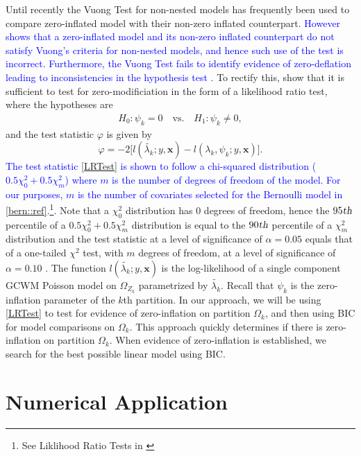 \documentclass[11pt,letterpaper]{article}
\numberwithin{equation}{section}
\numberwithin{equation}{section}
\numberwithin{equation}{section}
\begin{document}
Until recently the Vuong Test for non-nested models  \citep{vuongTest} has frequently been used to compare zero-inflated model with their non-zero inflated counterpart. \textcolor{blue}{However \cite{misuse} shows that a zero-inflated model and its non-zero inflated counterpart do not satisfy Vuong's criteria for non-nested models, and hence such use of the test is incorrect. Furthermore, the Vuong Test fails to identify evidence of zero-deflation leading to inconsistencies in the hypothesis test \citep[see][]{misuse}.} To rectify this, \cite{newIntuitive} show that it is sufficient to test for zero-modificiation in the form of a likelihood ratio test, where the hypotheses are
\begin{align*}
& & H_0: \psi_k = 0 \quad \text{vs.} \quad H_1: \psi_k \neq 0, & &
\end{align*}
and the test statistic $\varphi$ is given by
\begin{equation}
\varphi = -2 \big[l(\tilde{\lambda_k}; y, \bm{x}) - l(\lambda_k, \psi_k; y , \bm{x} )\big].
\label{LRTest}
\end{equation}
\textcolor{blue}{The test statistic \eqref{LRTest} is shown to follow a chi-squared distribution ($0.5\chi^2_0+0.5\chi^2_{m}$) where $m$ is the  number of degrees of freedom of the model. For our purposes, $m$ is the number of covariates selected for the Bernoulli model in \eqref{bern::ref}.\footnote{See Liklihood Ratio Tests in  \cite{newIntuitive}}. } Note that  a $\chi^2_0$ distribution has 0 degrees of freedom, hence the $95{\mbox{\sl{th}}}$ percentile of a  $0.5\chi^2_0+0.5\chi^2_{m}$ distribution is equal to the $90{\mbox{\sl{th}}}$ percentile of a $\chi^2_{m}$ distribution and the test statistic at a level of significance of $\alpha=0.05$ equals that of a one-tailed $\chi^2$ test, with $m$ degrees of freedom, at a level of significance of $\alpha=0.10$ \citep[see][]{newIntuitive}. The function 
$l(\tilde{\lambda_k}; y , \bm{x})$ is the log-likelihood of a single component GCWM Poisson model on $\Omega_{Z_k}$ parametrized by $\tilde{\lambda_k}$. Recall that $\psi_k$ is the zero-inflation parameter of the $k$th partition.  In our approach, we will be using \eqref{LRTest} to  test for evidence of zero-inflation on partition $\Omega_k$, and then using BIC for model comparisons on $\Omega_k$. This approach quickly determines if there is zero-inflation on partition $\Omega_k$.  When evidence of zero-inflation is established, we search for the best possible linear model using BIC. 

\section{Numerical Application}\label{sec:numapp}
\end{document}
